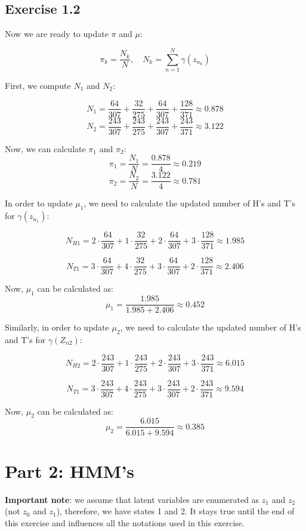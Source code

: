 \documentclass[11pt,a4paper]{article}
\begin{document}
	
	\subsection*{Exercise 1.2}
	
	Now we are ready to update $\pi$ and $\mu$:
	
	$$\pi_k = \frac{N_k}{N}, \quad N_k = \sum\limits_{n=1}^N \gamma(z_{n_k})$$
	
	First, we compute $N_1$ and $N_2$:
	
	$$ N_1 = \frac{64}{307} + \frac{32}{275} + \frac{64}{307} + \frac{128}{371} \approx 0.878$$
	$$ N_2 = \frac{243}{307} + \frac{243}{275} + \frac{243}{307} + \frac{243}{371} \approx 3.122$$
	
	Now, we can calculate $\pi_1$ and $\pi_2$:
	$$\pi_1 = \frac{N_1}{N} = \frac{0.878}{4} \approx 0.219$$
	$$\pi_2 = \frac{N_2}{N} = \frac{3.122}{4} \approx 0.781$$
	
	In order to update $\mu_1$, we need to calculate the updated number of H's and T's for $\gamma(z_{n_1})$:
	
	$$N_{H1}= 2 \cdot \frac{64}{307} + 1 \cdot  \frac{32}{275}  + 2 \cdot \frac{64}{307} + 3 \cdot \frac{128}{371} \approx 1.985$$
	
	$$N_{T1}= 3 \cdot \frac{64}{307} + 4 \cdot  \frac{32}{275}  + 3 \cdot \frac{64}{307} + 2 \cdot \frac{128}{371} \approx 2.406$$
	
	Now, $\mu_1$ can be calculated as:
	$$\mu_1 = \frac{1.985}{1.985+2.406} \approx 0.452 $$
	
	
	Similarly, in order to update $\mu_2$, we need to calculate the updated number of H's and T's for $\gamma(Z_{n2})$:
	
	$$N_{H2}= 2 \cdot \frac{243}{307} + 1 \cdot  \frac{243}{275}  + 2 \cdot \frac{243}{307} + 3 \cdot \frac{243}{371} \approx 6.015$$
	
	$$N_{T1}= 3 \cdot \frac{243}{307} + 4 \cdot  \frac{243}{275}  + 3 \cdot \frac{243}{307} + 2 \cdot \frac{243}{371} \approx 9.594$$
	
	Now, $\mu_2$ can be calculated as:
	$$\mu_2 = \frac{6.015}{6.015+9.594} \approx 0.385 $$
	
	
	\section*{Part 2:  HMM's}
	\textbf{Important note}: we assume that latent variables are enumerated as $z_1$ and $z_2$ (not $z_0$ and $z_1$), therefore, we have states 1 and 2. It stays true until the end of this exercise and influences all the notations used in this exercise.
	
\end{document}

